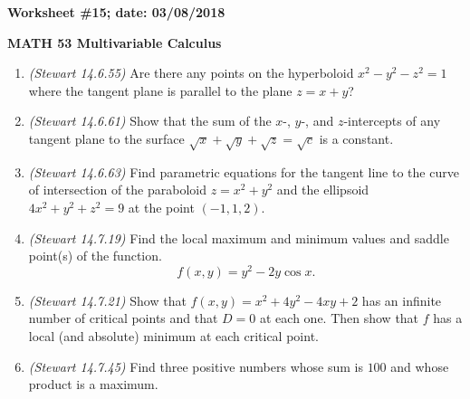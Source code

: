 \documentclass{article}
\begin{document}
{\bf Worksheet \#15; date: 03/08/2018}

{\bf MATH 53 Multivariable Calculus}

\begin{enumerate}
\item {\em (Stewart 14.6.55)} Are there any points on the hyperboloid $x^2 - y^2 - z^2 = 1$ where the tangent plane is parallel to the plane $z = x + y$?

\item {\em (Stewart 14.6.61)} Show that the sum of the $x$-, $y$-, and $z$-intercepts of any tangent plane to the surface $\sqrt{x} + \sqrt{y} + \sqrt{z} = \sqrt{c}$ is a constant.

\item {\em (Stewart 14.6.63)} Find parametric equations for the tangent line to the curve of intersection of the paraboloid $z = x^2 + y^2$ and the ellipsoid $4x^2 + y^2 + z^2 = 9$ at the point $(-1, 1, 2)$.

\item {\em (Stewart 14.7.19)} Find the local maximum and minimum values and saddle point(s) of the function.
\[
f(x, y) = y^2 - 2y \cos x.
\]

\item {\em (Stewart 14.7.21)} Show that $f(x, y) = x^2 + 4y^2 - 4xy + 2$ has an infinite number of critical points and that $D = 0$ at each one. Then show that $f$ has a local (and absolute) minimum at each critical point.

\item {\em (Stewart 14.7.45)} Find three positive numbers whose sum is $100$ and whose product is a maximum.
\end{enumerate}
\end{document}
